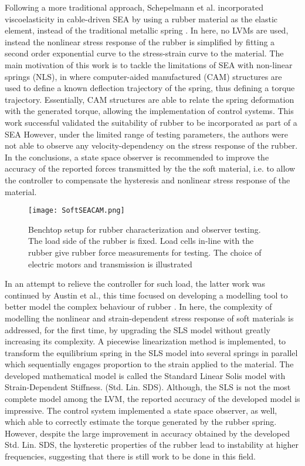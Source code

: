 Following a more traditional approach, Schepelmann et al. incorporated viscoelasticity in cable-driven SEA by using a rubber material as the elastic element, instead of the traditional metallic spring \cite{schepelmann2014compact}. In here, no LVMs are used, instead the nonlinear stress response of the rubber is simplified by fitting a second order exponential curve to the stress-strain curve to the material. The main motivation of this work is to tackle the limitations of SEA with non-linear springs (NLS), in where computer-aided manufactured (CAM) structures are used to define a known deflection trajectory of the spring, thus defining a torque trajectory. Essentially, CAM structures are able to relate the spring deformation with the generated torque, allowing the implementation of control systems. This work successful validated the suitability of rubber to be incorporated as part of a SEA However, under the limited range of testing parameters, the authors were not able to observe any velocity-dependency on the stress response of the rubber. In the conclusions, a state space observer is recommended to improve the accuracy of the reported forces transmitted by the the soft material, i.e. to allow the controller to compensate the hysteresis and nonlinear stress response of the material.

\begin{figure}[htb!]
    \centering
    \texttt{[image: SoftSEACAM.png]}
    \caption{Benchtop setup for rubber characterization and observer testing. The load side of the rubber is fixed. Load cells in-line with the rubber give rubber force measurements for testing. The choice of electric motors and transmission is illustrated \cite{schepelmann2014compact}}
    \label{fig:softSEACAM}
\end{figure}

In an attempt to relieve the controller for such load, the latter work was continued by Austin et al., this time focused on developing a modelling tool to better model the complex behaviour of rubber \cite{austin2015control}. In here, the complexity of modelling the nonlinear and strain-dependent stress response of soft materials is addressed, for the first time, by upgrading the SLS model without greatly increasing its complexity. A piecewise linearization method is implemented, to transform the equilibrium spring in the SLS model into several springs in parallel which sequentially engages proportion to the strain applied to the material. The developed mathematical model is called the Standard Linear Solis model with Strain-Dependent Stiffness. (Std. Lin. SDS). Although, the SLS is not the most complete model among the LVM, the reported accuracy of the developed model is impressive. The control system implemented a state space observer, as well, which able to correctly estimate the torque generated by the rubber spring. However, despite the large improvement in accuracy obtained by the developed Std. Lin. SDS, the hysteretic properties of the rubber  lead to instability at higher frequencies, suggesting that there is still work to be done in this field.


